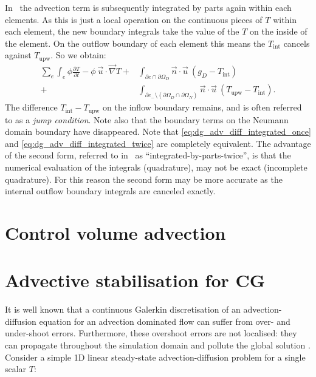 In \fluidity\ the advection term is subsequently integrated by parts again within each elements. As 
this is just a local operation on the continuous pieces of $T$ within each element, 
the new boundary integrals take the value of the $T$ on the inside of the element. On the outflow 
boundary of each element this means the $T_{\mathrm{int}}$ cancels against 
$T_{\mathrm{upw}}$. So we obtain:
\begin{equation}
\begin{split}
  \sum_e \int_e \phi \frac{\partial T}{\partial t}
    - \phi~\vec{u}\cdot\vec{\nabla} T 
    +& \int_{\partial e \cap\partial\Omega_D} \vec{n}\cdot\vec{u}~(g_D -T_{\mathrm{int}}) \\
    +& \int_{\partial e_-\setminus (\partial\Omega_D\cap\partial\Omega_N)} \vec{n}\cdot\vec{u}~
      (T_{\mathrm{upw}}-T_{\mathrm{int}}).
    \label{eq:dg_adv_diff_integrated_twice}
\end{split}
\end{equation}
The difference $T_{\mathrm{int}}-T_{\mathrm{upw}}$ on the inflow boundary remains, and is often referred 
to as a \emph{jump condition}. Note also that the boundary terms on the Neumann domain boundary have
disappeared. Note that \eqref{eq:dg_adv_diff_integrated_once} and 
\eqref{eq:dg_adv_diff_integrated_twice} are completely equivalent. The advantage of the second form, 
referred to in \fluidity\ as ``integrated-by-parts-twice'', is that the numerical evaluation of the
integrals (quadrature), may not be exact (incomplete quadrature). For this reason the second form may be
more accurate as the internal outflow boundary integrals are canceled exactly.

\section{Control volume advection}


\section{Advective stabilisation for CG}

It is well known that a continuous Galerkin discretisation of an
advection-diffusion equation for an advection dominated flow can suffer from
over- and under-shoot errors. Furthermore, these overshoot errors are not
localised: they can propagate throughout the simulation domain and pollute the
global solution \citep{hughes1987}. Consider a simple 1D linear steady-state
advection-diffusion problem for a single scalar $T$:

